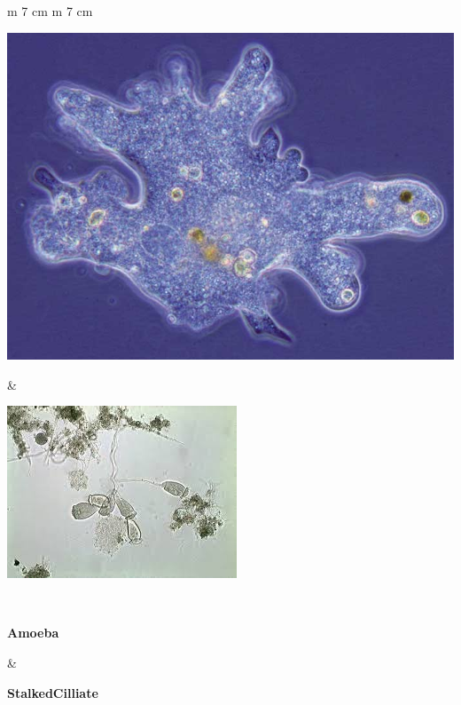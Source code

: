 \documentclass{article}
\begin{document}
\begin{tabular}{  m {7 cm}  m {7 cm} } 
\begin{center} \includegraphics[scale=0.35]{Amoeba} \end{center} & \begin{center}\includegraphics[scale=0.88]{StalkedCilliate} \end{center}\\
\begin{center} \textbf{Amoeba} \end{center} & \begin{center}\textbf{StalkedCilliate} \end{center}\\

\end{tabular}
\end{document}
